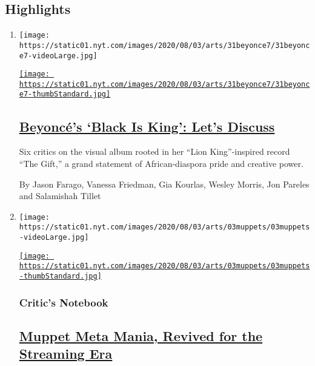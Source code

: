 \hypertarget{highlights}{%
\subsection{Highlights}\label{highlights}}

\begin{enumerate}
\def\labelenumi{\arabic{enumi}.}
\item
  \texttt{[image: https://static01.nyt.com/images/2020/08/03/arts/31beyonce7/31beyonce7-videoLarge.jpg]}

  \href{/2020/07/31/arts/music/beyonce-black-is-king.html}{\texttt{[image: https://static01.nyt.com/images/2020/08/03/arts/31beyonce7/31beyonce7-thumbStandard.jpg]}}

  \hypertarget{beyoncuxe9s-black-is-king-lets-discuss}{%
  \subsection{\texorpdfstring{\href{/2020/07/31/arts/music/beyonce-black-is-king.html}{Beyoncé's
  `Black Is King': Let's
  Discuss}}{Beyoncé's `Black Is King': Let's Discuss}}\label{beyoncuxe9s-black-is-king-lets-discuss}}

  Six critics on the visual album rooted in her ``Lion King''-inspired
  record ``The Gift,'' a grand statement of African-diaspora pride and
  creative power.

  By Jason Farago, Vanessa Friedman, Gia Kourlas, Wesley Morris, Jon
  Pareles and Salamishah Tillet
\item
  \texttt{[image: https://static01.nyt.com/images/2020/08/03/arts/03muppets/03muppets-videoLarge.jpg]}

  \href{/2020/07/31/arts/television/muppets-now.html}{\texttt{[image: https://static01.nyt.com/images/2020/08/03/arts/03muppets/03muppets-thumbStandard.jpg]}}

  \hypertarget{critics-notebook}{%
  \subsubsection{Critic's Notebook}\label{critics-notebook}}

  \hypertarget{muppet-meta-mania-revived-for-the-streaming-era}{%
  \subsection{\texorpdfstring{\href{/2020/07/31/arts/television/muppets-now.html}{Muppet
  Meta Mania, Revived for the Streaming
  Era}}{Muppet Meta Mania, Revived for the Streaming Era}}\label{muppet-meta-mania-revived-for-the-streaming-era}}


\end{enumerate}
